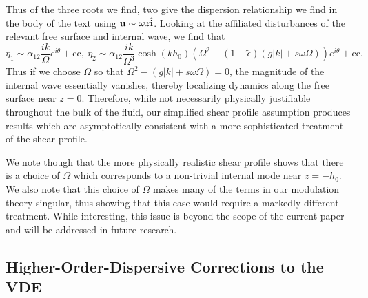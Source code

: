 \documentclass[a4paper,11pt]{article}
\begin{document}
Thus of the three roots we find, two give the dispersion relationship we find in the body of the text using ${\bf u}\sim \omega z \hat{{\bf i}}$.  Looking at the affiliated disturbances of the relevant free surface and internal wave, we find that  
\[
\eta_{1} \sim \alpha_{12}\frac{ik}{\Omega}e^{i\theta} + \mbox{cc}, ~ \eta_{2} \sim \alpha_{12}\frac{ik}{\Omega^{3}}\cosh(kh_{0})\left(\Omega^{2}-(1-\tilde{\epsilon})\left( g|k|+s\omega\Omega\right)\right)e^{i\theta}+ \mbox{cc}.
\]
Thus if we choose $\Omega$ so that $\Omega^{2}-\left( g|k|+s\omega\Omega\right)= 0$, the magnitude of the internal wave essentially vanishes, thereby localizing dynamics along the free surface near $z=0$.  Therefore, while not necessarily physically justifiable throughout the bulk of the fluid, our simplified shear profile assumption produces results which are asymptotically consistent with a more sophisticated treatment of the shear profile.  

We note though that the more physically realistic shear profile shows that there is a choice of $\Omega$ which corresponds to a non-trivial internal mode near $z=-h_{0}$.  We also note that this choice of $\Omega$ makes many of the terms in our modulation theory singular, thus showing that this case would require a markedly different treatment.  While interesting, this issue is beyond the scope of the current paper and will be addressed in future research. 

\subsection*{Higher-Order-Dispersive Corrections to the VDE}
\end{document}
